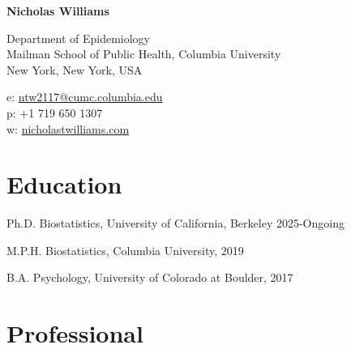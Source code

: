 \documentclass[12pt,letterpaper]{report}
\newcommand{\myname}{Nicholas Williams}
\newcommand{\namefont}[1]{{\normalfont\bfseries\Huge{#1}}}
\begin{document}
    \raggedright

    \namefont{\myname}

    \vspace{1em}
    \begin{minipage}[t]{0.64\textwidth}
        Department of Epidemiology \\
        Mailman School of Public Health, Columbia University
        \\ New York, New York, USA
    \end{minipage}
    \begin{minipage}[t]{0.34\textwidth}
        e: \href{mailto:ntw2117@cumc.columbia.edu}{ntw2117@cumc.columbia.edu} \\
        p: +1 719 650 1307 \\
        w: \href{https://nicholastwilliams.com/}{nicholastwilliams.com}
    \end{minipage}
    \vspace{0.5em}

    \section*{Education}

    \begin{tablist}
    
    	\item[Ph.D.] \tab Biostatistics, University of California, Berkeley 2025-Ongoing

        \item[M.P.H.]  \tab Biostatistics, Columbia University, 2019

        \item[B.A.]  \tab Psychology, University of Colorado at Boulder, 2017

    \end{tablist}

    \section*{Professional}
\end{document}
